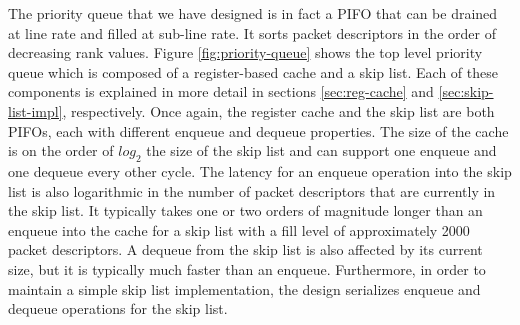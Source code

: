 The priority queue that we have designed is in fact a PIFO that can be drained at line rate and filled at sub-line rate. It sorts packet descriptors in the order of decreasing rank values. Figure \ref{fig:priority-queue} shows the top level priority queue which is composed of a register-based cache and a skip list. Each of these components is explained in more detail in sections \ref{sec:reg-cache} and \ref{sec:skip-list-impl}, respectively. Once again, the register cache and the skip list are both PIFOs, each with different enqueue and dequeue properties. The size of the cache is on the order of $log_2$ the size of the skip list and can support one enqueue and one dequeue every other cycle. The latency for an enqueue operation into the skip list is also logarithmic in the number of packet descriptors that are currently in the skip list. It typically takes one or two orders of magnitude longer than an enqueue into the cache for a skip list with a fill level of approximately 2000 packet descriptors. A dequeue from the skip list is also affected by its current size, but it is typically much faster than an enqueue. Furthermore, in order to maintain a simple skip list implementation, the design serializes enqueue and dequeue operations for the skip list.








